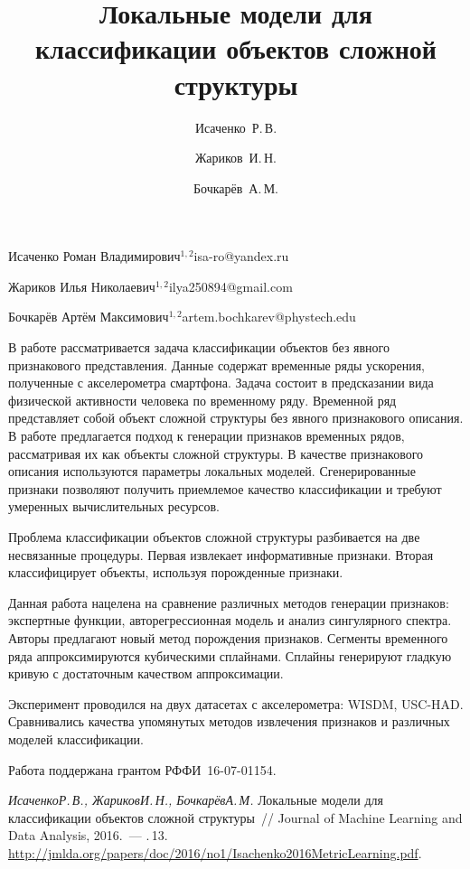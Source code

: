 \documentclass[twoside]{article}
\begin{document}
\Russian
\title{Локальные модели для классификации объектов сложной структуры}
\author{Исаченко~Р.\,В.}{Исаченко Роман Владимирович$^{1, 2}$}{isa-ro@yandex.ru}
\author{Жариков~И.\,Н.}{Жариков Илья Николаевич$^{1, 2}$}{ilya250894@gmail.com}
\author{Бочкарёв~А.\,М.}{Бочкарёв Артём Максимович$^{1, 2}$\speaker}{artem.bochkarev@phystech.edu}
\maketitle

В работе рассматривается задача классификации объектов без явного признакового представления. 
Данные содержат временные ряды ускорения, полученные с акселерометра смартфона.
Задача состоит в предсказании вида физической активности человека по временному ряду.
Временной ряд представляет собой объект сложной структуры без явного признакового описания.
В работе предлагается подход к генерации признаков временных рядов, рассматривая их как объекты сложной структуры.
В качестве признакового описания используются параметры локальных моделей.
Сгенерированные признаки позволяют получить приемлемое качество классификации и требуют умеренных вычислительных ресурсов.

Проблема классификации объектов сложной структуры разбивается на две несвязанные процедуры.
Первая извлекает информативные признаки. 
Вторая классифицирует объекты, используя порожденные признаки.

Данная работа нацелена на сравнение различных методов генерации признаков: экспертные функции, авторегрессионная модель и анализ сингулярного спектра.
Авторы предлагают новый метод порождения признаков.
Сегменты временного ряда аппроксимируются кубическими сплайнами. 
Сплайны генерируют гладкую кривую с достаточным качеством аппроксимации.

Эксперимент проводился на двух датасетах с акселерометра: WISDM, USC-HAD. 
Сравнивались качества упомянутых методов извлечения признаков и различных моделей классификации.

Работа поддержана грантом РФФИ \No\,16-07-01154.

\begin{thebibliography}{1}
    \emph{Исаченко\;Р.\,В., Жариков\;И.\,Н., Бочкарёв\;А.\,М.}
    Локальные модели для классификации объектов сложной структуры~//
    Journal of Machine Learning and Data Analysis, 2016.~--- \No.\,13. %
    \url{http://jmlda.org/papers/doc/2016/no1/Isachenko2016MetricLearning.pdf}.
\end{thebibliography}
\end{document}
